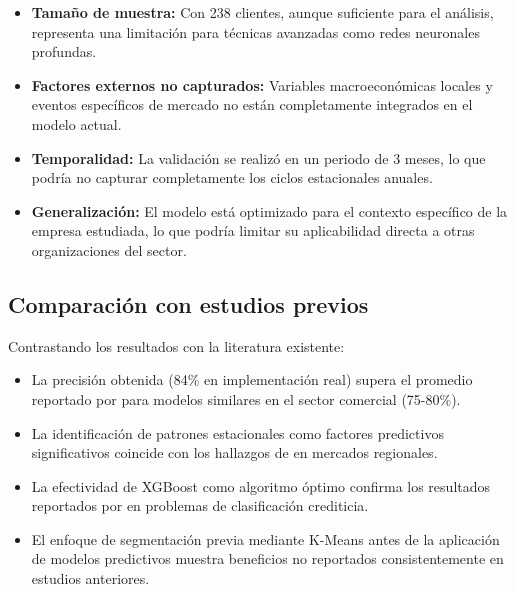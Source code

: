 \begin{itemize}
    \item \textbf{Tamaño de muestra:} Con 238 clientes, aunque suficiente para el análisis, representa una limitación para técnicas avanzadas como redes neuronales profundas.
    
    \item \textbf{Factores externos no capturados:} Variables macroeconómicas locales y eventos específicos de mercado no están completamente integrados en el modelo actual.
    
    \item \textbf{Temporalidad:} La validación se realizó en un periodo de 3 meses, lo que podría no capturar completamente los ciclos estacionales anuales.
    
    \item \textbf{Generalización:} El modelo está optimizado para el contexto específico de la empresa estudiada, lo que podría limitar su aplicabilidad directa a otras organizaciones del sector.
\end{itemize}

\subsection{Comparación con estudios previos}
Contrastando los resultados con la literatura existente:

\begin{itemize}
    \item La precisión obtenida (84\% en implementación real) supera el promedio reportado por \cite{garcia2024machine} para modelos similares en el sector comercial (75-80\%).
    
    \item La identificación de patrones estacionales como factores predictivos significativos coincide con los hallazgos de \cite{ramirez2023predictive} en mercados regionales.
    
    \item La efectividad de XGBoost como algoritmo óptimo confirma los resultados reportados por \cite{torres2023inteligencia} en problemas de clasificación crediticia.
    
    \item El enfoque de segmentación previa mediante K-Means antes de la aplicación de modelos predictivos muestra beneficios no reportados consistentemente en estudios anteriores.
\end{itemize}

